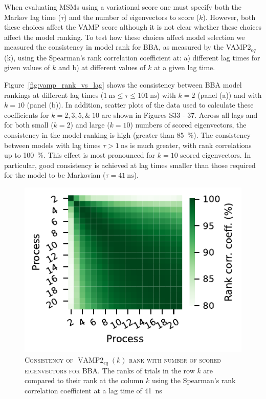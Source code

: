 \documentclass[journal=jacsat,manuscript=article]{achemso}
\begin{document}
When evaluating MSMs using a variational score one must specify both the Markov lag time ($\tau$) and the number of eigenvectors to score ($k$).  However, both these choices affect the VAMP score although it is not clear whether these choices affect the model ranking. To test how these choices affect model selection we measured the consistency in model rank for BBA, as measured by the VAMP2$_{eq}$(k), using the Spearman's rank correlation coefficient at: a) different lag times for given values of $k$ and b) at different values of $k$ at a given lag time. 

Figure~\ref{fig:vamp_rank_vs_lag} shows the consistency between BBA model rankings at different lag times ($\SI{1}{\nano\second}{\le}\tau{\le}\SI{101}{\nano\second}$) with $k{=}2$ (panel (a)) and with $k{=}10$ (panel (b)). In addition, scatter plots of the data used to calculate these coefficients for $k{=}2, 3, 5, \&\ 10$ are shown in Figures S33 - 37.  Across all lags and for both small ($k{=}2$) and large ($k{=}10$) numbers of scored eigenvectors, the consistency in the model ranking is high (greater than \SI{85}{\percent}). The consistency between models with lag times $\tau{>}\SI{1}{\nano\second}$ is much greater, with rank correlations up to \SI{100}{\percent}.  This effect is most pronounced for $k{=}10$ scored eigenvectors. In particular, good consistency is achieved at lag times smaller than those required for the model to be Markovian ($\tau{=}\SI{41}{\nano\second}$).


\begin{figure}[ht]
    \centering
    \includegraphics{results4/vampeq_rank_vs_proc.pdf}
    \caption{\textsc{Consistency of $\operatorname{VAMP2}_{eq}(k)$ rank with number of scored eigenvectors for BBA}. The ranks of trials in the row $k$ are compared to their rank at the column $k$ using the Spearman's rank correlation coefficient at a lag time of \SI{41}{\nano\second}}
    \label{fig:vampeq_rank_vs_n_procs}
\end{figure}
\end{document}
